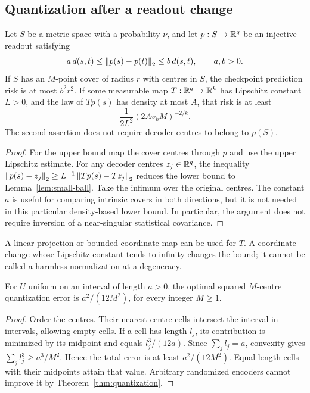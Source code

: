 \subsection{Quantization after a readout change}
\begin{proposition}\label{prop:readout-comparison}
Let $S$ be a metric space with a probability $\nu$, and let $p:S\to\mathbb R^q$
be an injective readout satisfying
\[
 a\,d(s,t)\le\left\lVert p(s)-p(t)\right\rVert_2\le b\,d(s,t),\qquad a,b>0.
\]
If $S$ has an $M$-point cover of radius $r$ with centres in $S$, the
checkpoint prediction risk is at most $b^2r^2$. If some measurable map
$T:\mathbb R^q\to\mathbb R^k$ has Lipschitz constant $L>0$, and the law of $Tp(s)$
has density at most $A$, that risk is at least
\[
 \frac{1}{2L^2}(2Av_kM)^{-2/k}.
\]
The second assertion does not require decoder centres to belong to $p(S)$.
\end{proposition}
\begin{proof}
For the upper bound map the cover centres through $p$ and use the upper
Lipschitz estimate. For any decoder centres $z_j\in\mathbb R^q$, the inequality
$\left\lVert p(s)-z_j\right\rVert_2\ge L^{-1}\left\lVert Tp(s)-Tz_j\right\rVert_2$ reduces the lower
bound to Lemma~\ref{lem:small-ball}. Take the infimum over the original
centres. The constant $a$ is useful for comparing intrinsic covers in both
directions, but it is not needed in this particular density-based lower
bound. In particular, the argument does not require inversion of a
near-singular statistical covariance.
\end{proof}

A linear projection or bounded coordinate map can be used for $T$.
A coordinate change whose Lipschitz constant tends to infinity changes the
bound; it cannot be called a harmless normalization at a degeneracy.

\begin{proposition}\label{prop:uniform-quantization}
For $U$ uniform on an interval of length $a>0$, the optimal squared
$M$-centre quantization error is $a^2/(12M^2)$, for every integer $M\ge1$.
\end{proposition}
\begin{proof}
Order the centres. Their nearest-centre cells intersect the interval in
intervals, allowing empty cells. If a cell has length $l_j$, its contribution
is minimized by its midpoint and equals $l_j^3/(12a)$. Since
$\sum_j l_j=a$, convexity gives
$\sum_j l_j^3\ge a^3/M^2$. Hence the total error is at least
$a^2/(12M^2)$. Equal-length cells with their midpoints attain that value.
Arbitrary randomized encoders cannot improve it by
Theorem~\ref{thm:quantization}.
\end{proof}

